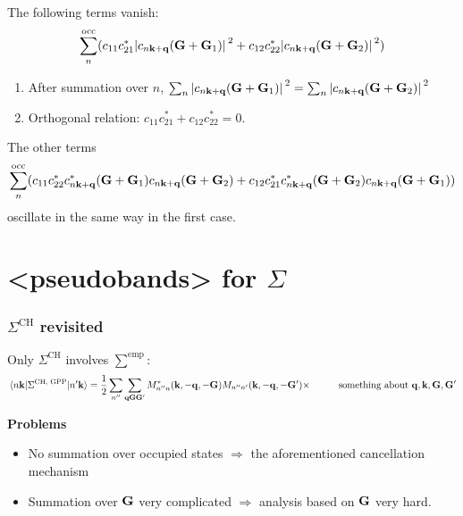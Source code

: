 \documentclass[t,aspectratio=169]{beamer}
\newcommand{\xmark}{\ding{55}}%
\newcommand{\shortcode}[1]{\texttt{#1}}
\def\\{}%
\def\texttt#1{<#1>}%
\begin{document}
\begin{frame}[allowframebreaks]
The following terms vanish:
\[
    \sum_n^{\text{occ}} (c_{11} c_{21}^* \abs*{c_{n \vb{k} + \vb{q}}(\vb{G} + \vb{G}_1)}^2 
    + c_{12} c_{22}^* \abs*{c_{n \vb{k} + \vb{q}}(\vb{G} + \vb{G}_2)}^2 )
\] 
\begin{enumerate}
    \item After summation over $n$, $\sum_n \abs*{c_{n \vb{k} + \vb{q}}(\vb{G} + \vb{G}_1)}^2  = \sum_n \abs*{c_{n \vb{k} + \vb{q}}(\vb{G} + \vb{G}_2)}^2 $
    \item Orthogonal relation: $c_{11} c_{21}^* + c_{12} c_{22}^* = 0.$
\end{enumerate}

The other terms 
\[
    \sum_n^{\text{occ}} (
        c_{11} c_{22}^* c_{n \vb{k} + \vb{q}}^*(\vb{G} + \vb{G}_1)  c_{n \vb{k} + \vb{q}}(\vb{G} + \vb{G}_2) + 
        c_{12} c_{21}^* c_{n \vb{k} + \vb{q}}^*(\vb{G} + \vb{G}_2) c_{n \vb{k} + \vb{q}}(\vb{G} + \vb{G}_1) 
    )
\]
oscillate in the same way in the first case.

\end{frame}


\section{\shortcode{pseudobands} for $\Sigma$}

\begin{frame}
\frametitle{$\Sigma^{\text{CH}}$ revisited}

Only $\Sigma^{\text{CH}}$ involves $\sum^{\text{emp}}$:
\begin{equation*}
    \begin{aligned}
        \mel*{n \vb{k}}{\Sigma^{\text{CH, GPP}}}{n' \vb{k}} 
        &= \frac{1}{2} \sum_{n''} \sum_{\vb{q} \vb{G} \vb{G}'} M_{n'' n}^*(\vb{k}, - \vb{q}, -\vb{G})
        M_{n'' n'}(\vb{k}, - \vb{q}, - \vb{G}') \times  \\
        &\quad \quad \text{something about $\vb{q}, \vb{k}, \vb{G}, \vb{G}'$}
    \end{aligned}
    \label{eq:ch.simple}
\end{equation*}

\textbf{Problems} \begin{itemize}
    \item No summation over occupied states $\Rightarrow$ 
    \xmark the aforementioned cancellation mechanism 
    \item Summation over $\vb{G}$ very complicated $\Rightarrow$
    analysis based on $\vb{G}$ very hard.
\end{itemize}

\end{frame}
\end{document}
